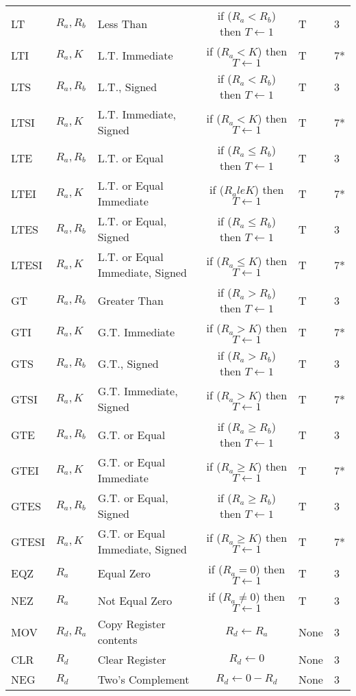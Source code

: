 \documentclass[12pt,twoside]{report}
\begin{document}
{\begin{longtable}{ | l | l | l | c | l | l | }
LT & $R_a, R_b$ & Less Than & if ($R_a < R_b$) then $T \leftarrow 1$ & T & 3 \\
LTI & $R_a, K$ & L.T. Immediate & if ($R_a < K$) then $T \leftarrow 1$ & T & 7* \\
LTS & $R_a, R_b$ & L.T., Signed & if ($R_a < R_b$) then $T \leftarrow 1$ & T & 3 \\
LTSI & $R_a, K$ & L.T. Immediate, Signed & if ($R_a < K$) then $T \leftarrow 1$ & T & 7* \\
LTE & $R_a, R_b$ & L.T. or Equal & if ($R_a \le R_b$) then $T \leftarrow 1$ & T & 3 \\
LTEI & $R_a, K$ & L.T. or Equal Immediate & if ($R_a le K$) then $T \leftarrow 1$ & T & 7* \\
LTES & $R_a, R_b$ & L.T. or Equal, Signed & if ($R_a \le R_b$) then $T \leftarrow 1$ & T & 3 \\
LTESI & $R_a, K$ & L.T. or Equal Immediate, Signed & if ($R_a \le K$) then $T \leftarrow 1$ & T & 7* \\
GT & $R_a, R_b$ & Greater Than & if ($R_a > R_b$) then $T \leftarrow 1$ & T & 3 \\
GTI & $R_a, K$ & G.T. Immediate & if ($R_a > K$) then $T \leftarrow 1$ & T & 7* \\
GTS & $R_a, R_b$ & G.T., Signed & if ($R_a > R_b$) then $T \leftarrow 1$ & T & 3 \\
GTSI & $R_a, K$ & G.T. Immediate, Signed & if ($R_a > K$) then $T \leftarrow 1$ & T & 7* \\
GTE & $R_a, R_b$ & G.T. or Equal & if ($R_a \ge R_b$) then $T \leftarrow 1$ & T & 3 \\
GTEI & $R_a, K$ & G.T. or Equal Immediate & if ($R_a \ge K$) then $T \leftarrow 1$ & T & 7* \\
GTES & $R_a, R_b$ & G.T. or Equal, Signed & if ($R_a \ge R_b$) then $T \leftarrow 1$ & T & 3 \\
GTESI & $R_a, K$ & G.T. or Equal Immediate, Signed & if ($R_a \ge K$) then $T \leftarrow 1$ & T & 7* \\
EQZ & $R_a$ & Equal Zero & if ($R_a = 0$) then $T \leftarrow 1$ & T & 3 \\
NEZ & $R_a$ & Not Equal Zero & if ($R_a \neq 0$) then $T \leftarrow 1$ & T & 3 \\
MOV & $R_d, R_a$ & Copy Register contents & $R_d \leftarrow R_a$ & None & 3 \\
CLR & $R_d$ & Clear Register & $R_d \leftarrow 0$ & None & 3 \\
NEG & $R_d$ & Two's Complement & $R_d \leftarrow 0 - R_d$ & None & 3 \\

\end{longtable}}
\end{document}
